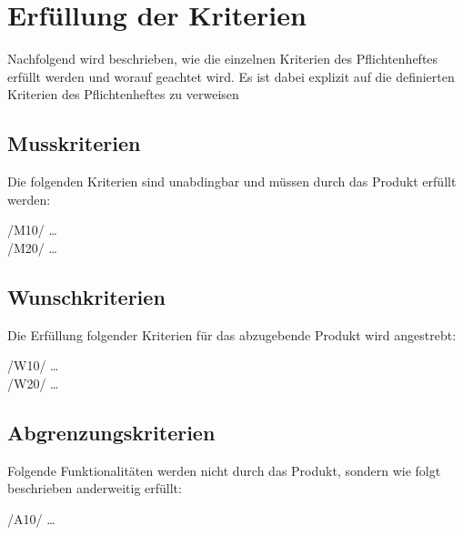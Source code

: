 \chapter{Erfüllung der Kriterien}

Nachfolgend wird beschrieben, wie die einzelnen Kriterien des Pflichtenheftes
erfüllt werden und worauf geachtet wird.  Es ist dabei explizit auf die
definierten Kriterien des Pflichtenheftes zu verweisen
\section{Musskriterien}

Die folgenden Kriterien sind unabdingbar und müssen durch das Produkt erfüllt
werden:

/M10/ … \\
/M20/ … \\

\section{Wunschkriterien}
Die Erfüllung folgender Kriterien für das abzugebende Produkt wird angestrebt:

/W10/ … \\
/W20/ … \\


\section{Abgrenzungskriterien}
Folgende Funktionalitäten werden nicht durch das Produkt, sondern wie folgt
beschrieben anderweitig erfüllt:

/A10/ … \\
